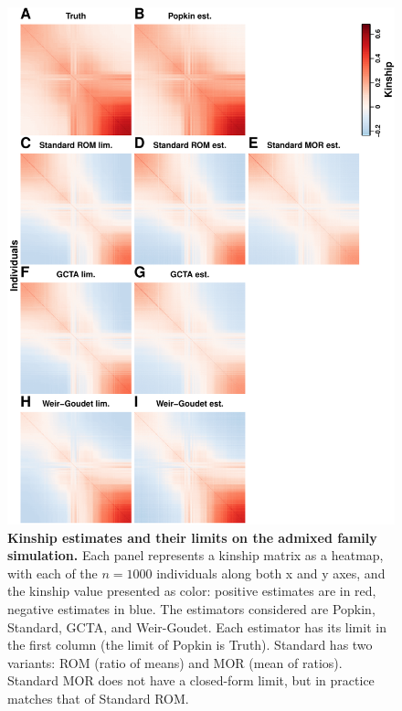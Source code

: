 \documentclass[11pt]{article}
\begin{document}
\begin{figure}[bp!]
  \centering
  \includegraphics[height=0.8\textheight]{kinship.pdf}
  \caption{
    {\bf Kinship estimates and their limits on the admixed family simulation.}
    Each panel represents a kinship matrix as a heatmap, with each of the $n=1000$ individuals along both x and y axes, and the kinship value presented as color: positive estimates are in red, negative estimates in blue.
    The estimators considered are Popkin, Standard, GCTA, and Weir-Goudet.
    Each estimator has its limit in the first column (the limit of Popkin is Truth).
    Standard has two variants: ROM (ratio of means) and MOR (mean of ratios).
    Standard MOR does not have a closed-form limit, but in practice matches that of Standard ROM.
  }
  \label{fig:kinship}
\end{figure}
\end{document}
